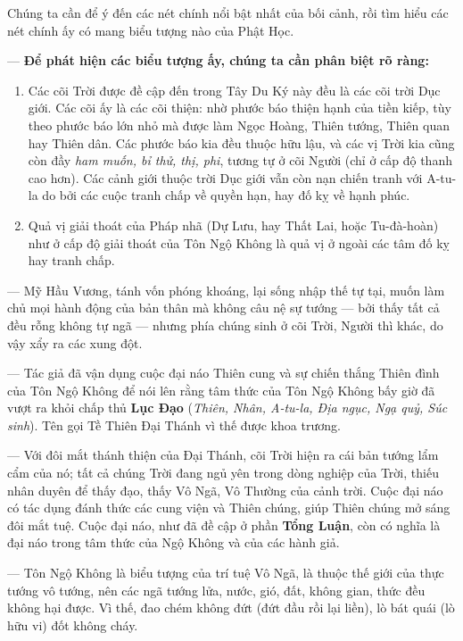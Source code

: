 Chúng ta cần để ý đến các nét chính nổi bật nhất của bối cảnh, rồi tìm hiểu các nét chính ấy có mang biểu tượng nào của Phật Học.

— {\bf Để phát hiện các biểu tượng ấy, chúng ta cần phân biệt rõ ràng:}

\begin{enumerate}[label=\itshape\alph*\upshape/]

    \item Các cõi Trời được đề cập đến trong Tây Du Ký này đều là các cõi trời Dục giới. Các cõi ấy là các cõi thiện: nhờ phước báo thiện hạnh của tiền kiếp, tùy theo phước báo lớn nhỏ mà được làm Ngọc Hoàng, Thiên tướng, Thiên quan hay Thiên dân. Các phước báo kia đều thuộc hữu lậu, và các vị Trời kia cũng còn đầy \emph{ham muốn, bỉ thử, thị, phi}, tương tự ở cõi Người (chỉ ở cấp độ thanh cao hơn). Các cảnh giới thuộc trời Dục giới vẫn còn nạn chiến tranh với A-tu-la do bởi các cuộc tranh chấp về quyền hạn, hay đố kỵ về hạnh phúc.

    \item Quả vị giải thoát của Pháp nhã (Dự Lưu, hay Thất Lai, hoặc Tu-đà-hoàn) như ở cấp độ giải thoát của Tôn Ngộ Không là quả vị ở ngoài các tâm đố kỵ hay tranh chấp.
\end{enumerate}

— Mỹ Hầu Vương, tánh vốn phóng khoáng, lại sống nhập thế tự tại, muốn làm chủ mọi hành động của bản thân mà không câu nệ sự tướng — bởi thấy tất cả đều rỗng không tự ngã — nhưng phía chúng sinh ở cõi Trời, Người thì khác, do vậy xẩy ra các xung đột.

— Tác giả đã vận dụng cuộc đại náo Thiên cung và sự chiến thắng Thiên đình của Tôn Ngộ Không để nói lên rằng tâm thức của Tôn Ngộ Không bấy giờ đã vượt ra khỏi chấp thủ {\bf Lục Đạo} (\emph{Thiên, Nhân, A-tu-la, Địa ngục, Ngạ quỷ, Súc sinh}). Tên gọi Tề Thiên Đại Thánh vì thế được khoa trương.

— Với đôi mắt thánh thiện của Đại Thánh, cõi Trời hiện ra cái bản tướng lẩm cẩm của nó; tất cả chúng Trời đang ngủ yên trong dòng nghiệp của Trời, thiếu nhân duyên để thấy đạo, thấy Vô Ngã, Vô Thường của cảnh trời. Cuộc đại náo có tác dụng đánh thức các cung viện và Thiên chúng, giúp Thiên chúng mở sáng đôi mắt tuệ. Cuộc đại náo, như đã đề cập ở phần \textbf{Tổng Luận}, còn có nghĩa là đại náo trong tâm thức của Ngộ Không và của các hành giả.

— Tôn Ngộ Không là biểu tượng của trí tuệ Vô Ngã, là thuộc thế giới của thực tướng vô tướng, nên các ngã tướng lửa, nước, gió, đất, không gian, thức đều không hại được. Vì thế, đao chém không đứt (đứt đầu rồi lại liền), lò bát quái (lò hữu vi) đốt không cháy.

